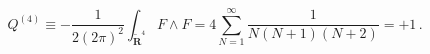 \begin{equation}
Q^{(4)} \equiv -\frac{1}{2(2\pi)^2}\int_{\tilde{\mathbf{R}}^4} F\wedge F 
= 4 \sum_{N=1}^{\infty} \frac{1}{N(N +1)(N+2)}=+1\,.\label{eq:4.1.23}
\end{equation}


